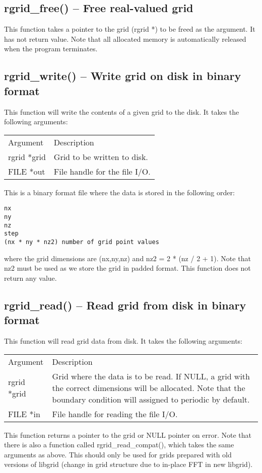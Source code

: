 \documentclass[12pt,letterpaper]{report}
\begin{document}
\subsection{rgrid\_free() -- Free real-valued grid}

This function takes a pointer to the grid (rgrid *) to be freed as the argument. It has not return value. Note that all allocated memory is automatically released when the program terminates.

\subsection{rgrid\_write() -- Write grid on disk in binary format}

This function will write the contents of a given grid to the disk. It takes the following arguments:
\begin{longtable}{p{} p{}}
Argument & Description\\
\cline{1-2}
rgrid *grid & Grid to be written to disk.\\
FILE *out & File handle for the file I/O.\\
\end{longtable}
\noindent
This is a binary format file where the data is stored in the following order:
\begin{verbatim}
nx
ny
nz
step
(nx * ny * nz2) number of grid point values
\end{verbatim}
where the grid dimensions are (nx,ny,nz) and nz2 = 2 * (nz / 2 + 1). Note that nz2 must be used as we store the grid in padded format. This function does not return any value.

\subsection{rgrid\_read() -- Read grid from disk in binary format}

This function will read grid data from disk. It takes the following arguments:
\begin{longtable}{p{} p{}}
Argument & Description\\
\cline{1-2}
rgrid *grid & Grid where the data is to be read. If NULL, a grid with the correct dimensions will be allocated. Note that the boundary condition will assigned to periodic by default.\\
FILE *in & File handle for reading the file I/O.\\
\end{longtable}
This function returns a pointer to the grid or NULL pointer on error. Note that there is also a function called rgrid\_read\_compat(), which takes the same arguments as above. This should only be used for grids prepared with old versions of libgrid (change in grid structure due to in-place FFT in new libgrid).
\end{document}
